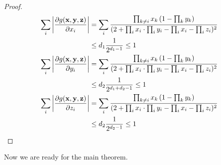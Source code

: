 	\begin{proof}
		\begin{align*}
		 \sum_i\left\vert \frac{\partial g({\bf x,y,z})}{\partial x_i} \right\vert &= \sum_i \frac{\prod_{k\neq i} x_k \left( 1 - \prod_k y_k \right)}{(2+\prod_i x_i \cdot \prod_i y_i - \prod_i x_i - \prod_i z_i)^2} \\
		&\leq d_1 \frac{1}{2^{d_1 - 1}}  \leq 1 \\
		 \sum_i\left\vert \frac{\partial g({\bf x,y,z})}{\partial y_i} \right\vert &= \sum_i \frac{\prod_{k\neq i} x_k \left( 1 - \prod_k y_k \right)}{(2+\prod_i x_i \cdot \prod_i y_i - \prod_i x_i - \prod_i z_i)^2} \\
		&\leq d_2 \frac{1}{2^{d_1 + d_2 - 1}} \leq 1 \\
		 \sum_i\left\vert \frac{\partial g({\bf x,y,z})}{\partial z_i} \right\vert &= \sum_i \frac{\prod_{k\neq i} x_k \left( 1 - \prod_k y_k \right)}{(2+\prod_i x_i \cdot \prod_i y_i - \prod_i x_i - \prod_i z_i)^2} \\
		&\leq d_2 \frac{1}{2^{d_2 - 1}} \leq 1 \\
		\end{align*}
	\end{proof}

	Now we are ready for the main theorem.

